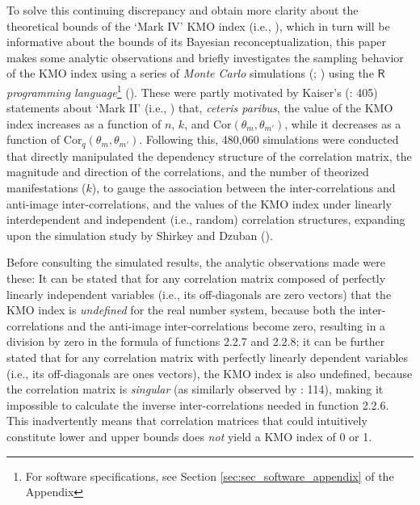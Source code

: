 \documentclass[
  10pt,
  a4paper,
  twoside]{article}
\begin{document}
To solve this continuing discrepancy and obtain more clarity about the theoretical bounds of the `Mark IV' KMO index (i.e., ), which in turn will be informative about the bounds of its Bayesian reconceptualization, this paper makes some analytic observations and briefly investigates the sampling behavior of the KMO index using a series of \emph{Monte Carlo} simulations (; ) using the \(\textsf{R}\) \emph{programming language}\footnote{For software specifications, see Section \ref{sec:sec_software_appendix} of the Appendix} (). These were partly motivated by Kaiser's (: 405) statements about `Mark II' (i.e., ) that, \emph{ceteris paribus}, the value of the KMO index increases as a function of \(n\), \(k\), and \(\text{Cor}(\theta_m, \theta_{m'})\), while it decreases as a function of \(\text{Cor}_q(\theta_m, \theta_{m'})\). Following this, 480,060 simulations were conducted that directly manipulated the dependency structure of the correlation matrix, the magnitude and direction of the correlations, and the number of theorized manifestations (\(k\)), to gauge the association between the inter-correlations and anti-image inter-correlations, and the values of the KMO index under linearly interdependent and independent (i.e., random) correlation structures, expanding upon the simulation study by Shirkey and Dzuban ().

Before consulting the simulated results, the analytic observations made were these: It can be stated that for any correlation matrix composed of perfectly linearly independent variables (i.e., its off-diagonals are zero vectors) that the KMO index is \emph{undefined} for the real number system, because both the inter-correlations and the anti-image inter-correlations become zero, resulting in a division by zero in the formula of functions 2.2.7 and 2.2.8; it can be further stated that for any correlation matrix with perfectly linearly dependent variables (i.e., its off-diagonals are ones vectors), the KMO index is also undefined, because the correlation matrix is \emph{singular} (as similarly observed by : 114), making it impossible to calculate the inverse inter-correlations needed in function 2.2.6. This inadvertently means that correlation matrices that could intuitively constitute lower and upper bounds does \emph{not} yield a KMO index of 0 or 1.
\end{document}
